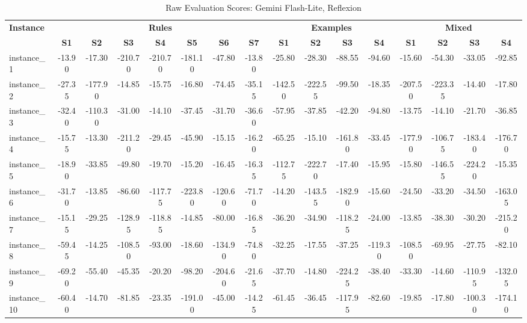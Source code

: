 \documentclass[sigconf]{acmart}
\begin{document}
\begin{table}[htbp]
  \centering
  \scriptsize
  \caption{Raw Evaluation Scores: Gemini Flash-Lite, Reflexion}
  \label{tab:raw-gemini-indiv}
  \begin{tabular}{l ccccccc cccc cccc}
  \toprule
  \textbf{Instance} & \multicolumn{7}{c}{\textbf{Rules}} & \multicolumn{4}{c}{\textbf{Examples}} & \multicolumn{4}{c}{\textbf{Mixed}} \\
  \cmidrule(lr){2-8}\cmidrule(lr){9-12}\cmidrule(lr){13-16}
   & \textbf{S1} & \textbf{S2} & \textbf{S3} & \textbf{S4} & \textbf{S5} & \textbf{S6} & \textbf{S7} & \textbf{S1} & \textbf{S2} & \textbf{S3} & \textbf{S4} & \textbf{S1} & \textbf{S2} & \textbf{S3} & \textbf{S4} \\
  \midrule
  instance\_1 & -13.90 & -17.30 & -210.70 & -210.70 & -181.10 & -47.80 & -13.80 & -25.80 & -28.30 & -88.55 & -94.60 & -15.60 & -54.30 & -33.05 & -92.85 \\
  instance\_2 & -27.35 & -177.90 & -14.85 & -15.75 & -16.80 & -74.45 & -35.15 & -142.50 & -222.55 & -99.50 & -18.35 & -207.50 & -223.35 & -14.40 & -17.80 \\
  instance\_3 & -32.40 & -110.30 & -31.00 & -14.10 & -37.45 & -31.70 & -36.60 & -57.95 & -37.85 & -42.20 & -94.80 & -13.75 & -14.10 & -21.70 & -36.85 \\
  instance\_4 & -15.75 & -13.30 & -211.20 & -29.45 & -45.90 & -15.15 & -16.20 & -65.25 & -15.10 & -161.80 & -33.45 & -177.90 & -106.75 & -183.40 & -176.70 \\
  instance\_5 & -18.90 & -33.85 & -49.80 & -19.70 & -15.20 & -16.45 & -16.35 & -112.75 & -222.70 & -17.40 & -15.95 & -15.80 & -146.55 & -224.20 & -15.35 \\
  instance\_6 & -31.70 & -13.85 & -86.60 & -117.75 & -223.80 & -120.60 & -71.70 & -14.20 & -143.55 & -182.90 & -15.60 & -24.50 & -33.20 & -34.50 & -163.05 \\
  instance\_7 & -15.15 & -29.25 & -128.95 & -118.85 & -14.85 & -80.00 & -16.85 & -36.20 & -34.90 & -118.25 & -24.00 & -13.85 & -38.30 & -30.20 & -215.20 \\
  instance\_8 & -59.45 & -14.25 & -108.50 & -93.00 & -18.60 & -134.90 & -74.80 & -32.25 & -17.55 & -37.25 & -119.30 & -108.50 & -69.95 & -27.75 & -82.10 \\
  instance\_9 & -69.20 & -55.40 & -45.35 & -20.20 & -98.20 & -204.60 & -21.65 & -37.70 & -14.80 & -224.25 & -38.40 & -33.30 & -14.60 & -110.95 & -132.05 \\
  instance\_10 & -60.40 & -14.70 & -81.85 & -23.35 & -191.00 & -45.00 & -14.25 & -61.45 & -36.45 & -117.95 & -82.60 & -19.85 & -17.80 & -100.30 & -174.10 \\

\end{tabular}
\end{table}
\end{document}
